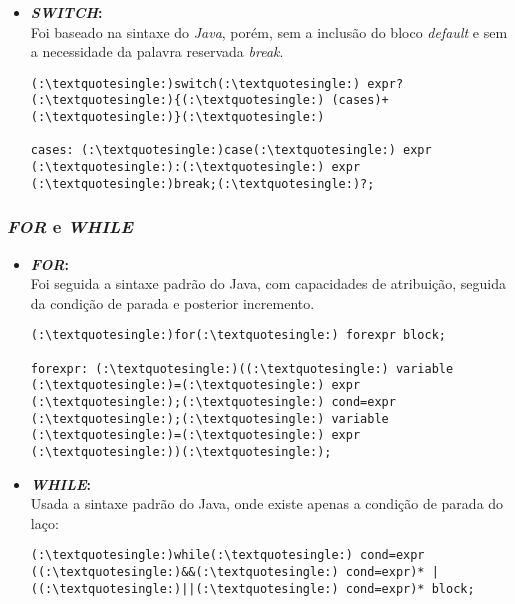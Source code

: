 \begin{itemize}
\begin{itemize}
        			\item \textbf{\textit{SWITCH}:}\\
        				Foi baseado na sintaxe do \textit{Java}, porém, sem a inclusão do bloco \textit{default} e sem a necessidade da palavra reservada \textit{break}.
        				\begin{lstlisting}
(:\textquotesingle:)switch(:\textquotesingle:) expr? (:\textquotesingle:){(:\textquotesingle:) (cases)+ (:\textquotesingle:)}(:\textquotesingle:)

cases: (:\textquotesingle:)case(:\textquotesingle:) expr (:\textquotesingle:):(:\textquotesingle:) expr (:\textquotesingle:)break;(:\textquotesingle:)?;
        				\end{lstlisting}
        		\end{itemize}
        
        \subsubsection{\normalsize \textit{FOR} e \textit{WHILE}}
        		\begin{itemize}
        			\item \textbf{\textit{FOR}:}\\
        				Foi seguida a sintaxe padrão do Java, com capacidades de atribuição, seguida da condição de parada e posterior incremento.
        				
        				\begin{lstlisting}
(:\textquotesingle:)for(:\textquotesingle:) forexpr block;

forexpr: (:\textquotesingle:)((:\textquotesingle:) variable (:\textquotesingle:)=(:\textquotesingle:) expr (:\textquotesingle:);(:\textquotesingle:) cond=expr (:\textquotesingle:);(:\textquotesingle:) variable (:\textquotesingle:)=(:\textquotesingle:) expr (:\textquotesingle:))(:\textquotesingle:);
        				\end{lstlisting}
        				
        			\item \textbf{\textit{WHILE}:}\\
        				Usada a sintaxe padrão do Java, onde existe apenas a condição de parada do laço:
        				\begin{lstlisting}
(:\textquotesingle:)while(:\textquotesingle:) cond=expr ((:\textquotesingle:)&&(:\textquotesingle:) cond=expr)* | ((:\textquotesingle:)||(:\textquotesingle:) cond=expr)* block;
        				\end{lstlisting}
        		\end{itemize}


\end{itemize}

